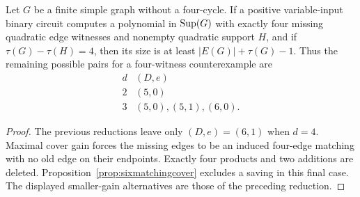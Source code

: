 \begin{theorem}\label{thm:fourmaxgain}
Let $G$ be a finite simple graph without a four-cycle. If a positive variable-input binary circuit computes a polynomial in $\operatorname{Sup}(G)$ with exactly four missing quadratic edge witnesses and nonempty quadratic support $H$, and if $\tau(G)-\tau(H)=4$, then its size is at least $|E(G)|+\tau(G)-1$.
Thus the remaining possible pairs for a four-witness counterexample are
\[
\begin{array}{c|l}
d&(D,e)\\\hline
2&(5,0)\\
3&(5,0),(5,1),(6,0).
\end{array}
\]
\end{theorem}
\begin{proof}
The previous reductions leave only $(D,e)=(6,1)$ when $d=4$. Maximal cover gain forces the missing edges to be an induced four-edge matching with no old edge on their endpoints. Exactly four products and two additions are deleted. Proposition~\ref{prop:sixmatchingcover} excludes a saving in this final case. The displayed smaller-gain alternatives are those of the preceding reduction.
\end{proof}
